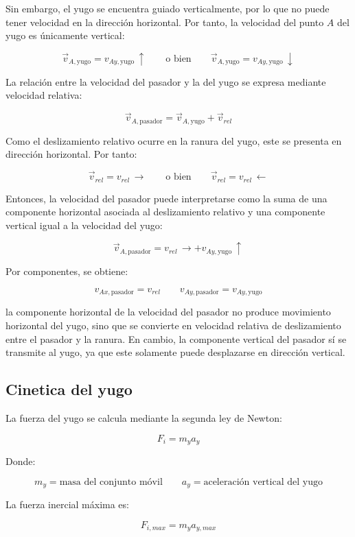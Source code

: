 \documentclass[12pt,letterpaper]{article}
\begin{document}
Sin embargo, el yugo se encuentra guiado verticalmente, por lo que no puede tener velocidad en la dirección horizontal. Por tanto, la velocidad del punto \(A\) del yugo es únicamente vertical:

\[
\vec{v}_{A,\text{yugo}} = v_{Ay,\text{yugo}}\,\uparrow
\qquad \text{o bien} \qquad
\vec{v}_{A,\text{yugo}} = v_{Ay,\text{yugo}}\,\downarrow
\]

La relación entre la velocidad del pasador y la del yugo se expresa mediante velocidad relativa:

\[
\vec{v}_{A,\text{pasador}}=\vec{v}_{A,\text{yugo}}+\vec{v}_{rel}
\]

Como el deslizamiento relativo ocurre en la ranura del yugo, este se presenta en dirección horizontal. Por tanto:

\[
\vec{v}_{rel}=v_{rel}\,\rightarrow
\qquad \text{o bien} \qquad
\vec{v}_{rel}=v_{rel}\,\leftarrow
\]

Entonces, la velocidad del pasador puede interpretarse como la suma de una componente horizontal asociada al deslizamiento relativo y una componente vertical igual a la velocidad del yugo:

\[
\vec{v}_{A,\text{pasador}} = v_{rel}\,\rightarrow + v_{Ay,\text{yugo}}\,\uparrow
\]

Por componentes, se obtiene:

\[
v_{Ax,\text{pasador}} = v_{rel}
\qquad
v_{Ay,\text{pasador}} = v_{Ay,\text{yugo}}
\]

la componente horizontal de la velocidad del pasador no produce movimiento horizontal del yugo, sino que se convierte en velocidad relativa de deslizamiento entre el pasador y la ranura. En cambio, la componente vertical del pasador sí se transmite al yugo, ya que este solamente puede desplazarse en dirección vertical.

\subsection{Cinetica del yugo}

La fuerza del yugo se calcula mediante la segunda ley de Newton:

\[
F_i=m_y a_y
\]

Donde:

\[
m_y = \text{masa del conjunto móvil}
\qquad
a_y = \text{aceleración vertical del yugo}
\]

La fuerza inercial máxima es:

\[
F_{i,max}=m_y a_{y,max}
\]
\end{document}
